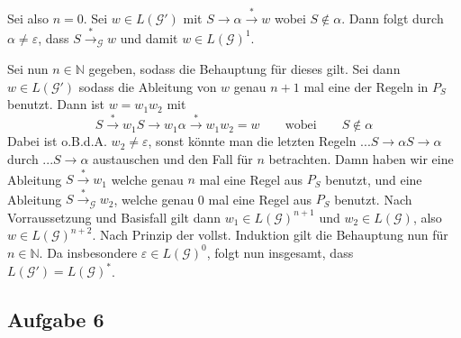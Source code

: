 \documentclass[a4paper,graphics,11pt]{article}
\newcommand{\aufgabe}[1]{\subsection*{Aufgabe #1}}
\begin{document}
Sei also $n = 0$. Sei $w \in L(\mathcal{G}')$ mit $S \to \alpha \overset{*}{\to} w$ wobei $S \notin \alpha$.
Dann folgt durch $\alpha \neq \varepsilon$, dass $S \overset{*}{\to}_\mathcal{G} w$
und damit $w \in L(\mathcal{G})^1$.

Sei nun $n \in \mathbb{N}$ gegeben, sodass die Behauptung für dieses gilt.
Sei dann $w \in L(\mathcal{G}')$ sodass die Ableitung von $w$ genau $n+1$ mal eine der Regeln in $P_S$ benutzt.
Dann ist $w = w_1w_2$ mit
$$
    S \overset{*}{\to} w_1S \to w_1\alpha \overset{*}{\to} w_1w_2 = w
    \qquad\text{wobei}\qquad
    S \notin \alpha
$$
Dabei ist o.B.d.A. $w_2 \neq \varepsilon$, sonst könnte man die letzten Regeln $... S \to \alpha S \to \alpha$
durch $... S \to \alpha$ austauschen und den Fall für $n$ betrachten.
Damn haben wir eine Ableitung $S \overset{*}{\to} w_1$ welche genau $n$ mal eine Regel aus $P_S$ benutzt,
und eine Ableitung $S \overset{*}{\to}_\mathcal{G} w_2$, welche genau 0 mal eine Regel aus $P_S$ benutzt.
Nach Vorraussetzung und Basisfall gilt dann $w_1 \in L(\mathcal{G})^{n+1}$ und $w_2 \in L(\mathcal{G})$,
also $w \in L(\mathcal{G})^{n+2}$. Nach Prinzip der vollst. Induktion gilt die Behauptung nun für
$n \in \mathbb{N}$. Da insbesondere $\varepsilon \in L(\mathcal{G})^0$, folgt nun insgesamt, dass
$L(\mathcal{G}') = L(\mathcal{G})^*$.

\newpage

\aufgabe{6}
\end{document}
